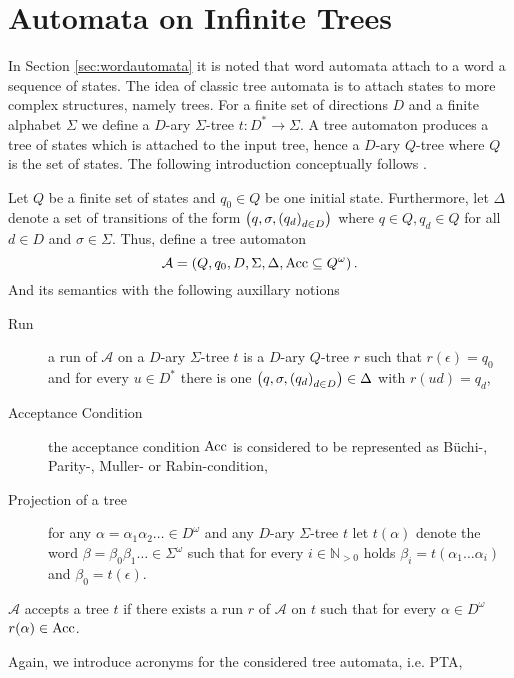 \section{Automata on Infinite Trees}
In Section \ref{sec:wordautomata} it is noted that word automata attach to a
word a sequence of states. The idea of classic tree automata is to attach
states to more complex structures, namely trees. For a finite set of
directions $D$ and a finite alphabet $\Sigma$ we define a $D$-ary $\Sigma$-tree
$t:D^{*}\rightarrow\Sigma$. A tree automaton produces a tree of states
which is attached to the input tree, hence a $D$-ary $Q$-tree where $Q$ is the
set of states. The following introduction conceptually follows 
\cite[Chapter 8]{AutoLogInfGames}.
\begin{definition}
  Let $Q$ be a finite set of states and $q_{0}\in Q$ be one initial state.
  Furthermore, let $\Delta$ denote a set of transitions of the form
  $\left(q,\sigma, \left(q_{d}\right)_{d\in D}\right)$ where $q\in Q, q_{d}\in Q$ for
  all $d\in D$ and $\sigma\in\Sigma$. Thus, define a tree automaton
  \begin{equation*}
    \mathcal{A} = \left(Q, q_{0}, D, \Sigma, \Delta, \operatorname{Acc}\subseteq Q^{\omega}\right).
  \end{equation*}
  And its semantics with the following auxillary notions
  \begin{description}
    \item[Run] a run of $\mathcal{A}$ on a $D$-ary $\Sigma$-tree $t$ is a
      $D$-ary $Q$-tree $r$ such that $r(\epsilon) = q_{0}$ and for every 
      $u\in D^{*}$ there is one 
      $\left(q,\sigma, \left(q_{d}\right)_{d\in D}\right)\in\Delta$ with $r(ud) = q_{d}$,
    \item[Acceptance Condition] the acceptance condition $\operatorname{Acc}$ is considered
      to be represented as Büchi-, Parity-, Muller- or Rabin-condition,
    \item[Projection of a tree] for any $\alpha=\alpha_{1}\alpha_{2}\dots\in
      D^{\omega}$ and any $D$-ary $\Sigma$-tree $t$ let $t(\alpha)$ denote the 
      word $\beta = \beta_{0}\beta_{1}\dots\in\Sigma^{\omega}$ such that for 
      every $i\in\mathbb{N}_{>0}$ holds 
      $\beta_{i} = t(\alpha_{1}\dots\alpha_{i})$ and $\beta_{0} = t(\epsilon)$.
  \end{description}
  $\mathcal{A}$ accepts a tree $t$ if there exists a run $r$ of $\mathcal{A}$
  on $t$ such that for every $\alpha\in D^{\omega}$ $r(\alpha)\in\operatorname{Acc}$.
\end{definition}
Again, we introduce acronyms for the considered tree automata, i.e. \ac{PTA},
